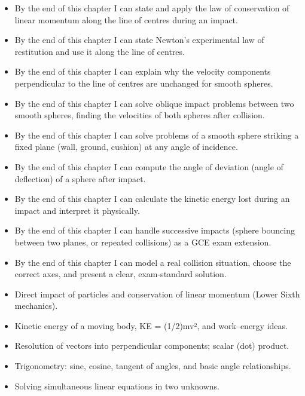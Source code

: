 \documentclass[11pt]{article}
\begin{document}
\begin{objectifs}
\begin{itemize}
\item By the end of this chapter I can state and apply the law of conservation of linear momentum along the line of centres during an impact.
\item By the end of this chapter I can state Newton's experimental law of restitution and use it along the line of centres.
\item By the end of this chapter I can explain why the velocity components perpendicular to the line of centres are unchanged for smooth spheres.
\item By the end of this chapter I can solve oblique impact problems between two smooth spheres, finding the velocities of both spheres after collision.
\item By the end of this chapter I can solve problems of a smooth sphere striking a fixed plane (wall, ground, cushion) at any angle of incidence.
\item By the end of this chapter I can compute the angle of deviation (angle of deflection) of a sphere after impact.
\item By the end of this chapter I can calculate the kinetic energy lost during an impact and interpret it physically.
\item By the end of this chapter I can handle successive impacts (sphere bouncing between two planes, or repeated collisions) as a GCE exam extension.
\item By the end of this chapter I can model a real collision situation, choose the correct axes, and present a clear, exam-standard solution.
\end{itemize}
\end{objectifs}

\begin{prerequis}
\begin{itemize}
\item Direct impact of particles and conservation of linear momentum (Lower Sixth mechanics).
\item Kinetic energy of a moving body, KE = (1/2)mv², and work–energy ideas.
\item Resolution of vectors into perpendicular components; scalar (dot) product.
\item Trigonometry: sine, cosine, tangent of angles, and basic angle relationships.
\item Solving simultaneous linear equations in two unknowns.
\end{itemize}
\end{prerequis}
\end{document}
